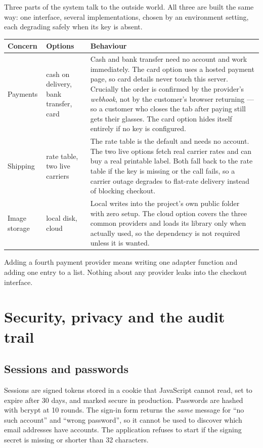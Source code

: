 \documentclass[11pt,a4paper]{report}
\begin{document}
Three parts of the system talk to the outside world. All three are built the
same way: one interface, several implementations, chosen by an environment
setting, each degrading safely when its key is absent.

\begin{longtable}{@{}p{}p{}p{}@{}}
\toprule
\textbf{Concern} & \textbf{Options} & \textbf{Behaviour}\\
\midrule
\endhead
Payments &
cash on delivery, bank transfer, card &
Cash and bank transfer need no account and work immediately. The card option
uses a hosted payment page, so card details never touch this server. Crucially
the order is confirmed by the provider's \emph{webhook}, not by the customer's
browser returning --- so a customer who closes the tab after paying still gets
their glasses. The card option hides itself entirely if no key is
configured.\\
\addlinespace
Shipping &
rate table, two live carriers &
The rate table is the default and needs no account. The two live options fetch
real carrier rates and can buy a real printable label. Both fall back to the
rate table if the key is missing or the call fails, so a carrier outage
degrades to flat-rate delivery instead of blocking checkout.\\
\addlinespace
Image storage &
local disk, cloud &
Local writes into the project's own public folder with zero setup. The cloud
option covers the three common providers and loads its library only when
actually used, so the dependency is not required unless it is wanted.\\
\bottomrule
\end{longtable}

Adding a fourth payment provider means writing one adapter function and adding
one entry to a list. Nothing about any provider leaks into the checkout
interface.

\chapter{Security, privacy and the audit trail}

\section{Sessions and passwords}

Sessions are signed tokens stored in a cookie that JavaScript cannot read, set
to expire after 30 days, and marked secure in production. Passwords are hashed
with bcrypt at 10 rounds. The sign-in form returns the \emph{same} message for
``no such account'' and ``wrong password'', so it cannot be used to discover
which email addresses have accounts. The application refuses to start if the
signing secret is missing or shorter than 32 characters.
\end{document}
